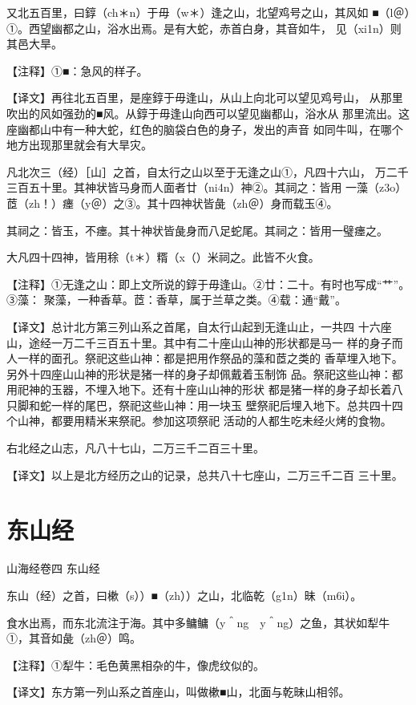 \documentclass[a4paper,12pt,UTF8,twoside]{ctexbook}
\begin{document}
又北五百里，曰錞（ch＊n）于毋（w＊）逢之山，北望鸡号之山，其风如 ■（l＠）①。西望幽都之山，浴水出焉。是有大蛇，赤首白身，其音如牛， 见（xi1n）则其邑大旱。

【注释】①■：急风的样子。

【译文】再往北五百里，是座錞于毋逢山，从山上向北可以望见鸡号山， 从那里吹出的风如强劲的■风。从錞于毋逢山向西可以望见幽都山，浴水从 那里流出。这座幽都山中有一种大蛇，红色的脑袋白色的身子，发出的声音 如同牛叫，在哪个地方出现那里就会有大旱灾。

凡北次三（经）［山］之首，自太行之山以至于无逢之山①，凡四十六山， 万二千三百五十里。其神状皆马身而人面者廿（ni4n）神②。其祠之：皆用 一藻（z3o）茝（zh！）瘗（y＠）之③。其十四神状皆彘（zh＠）身而载玉④。

其祠之：皆玉，不瘗。其十神状皆彘身而八足蛇尾。其祠之：皆用一璧瘗之。

大凡四十四神，皆用稌（t＊）糈（x（）米祠之。此皆不火食。

【注释】①无逢之山：即上文所说的錞于毋逢山。②廿：二十。有时也写成“艹”。③藻： 聚藻，一种香草。茝：香草，属于兰草之类。④载：通“戴”。

【译文】总计北方第三列山系之首尾，自太行山起到无逢山止，一共四 十六座山，途经一万二千三百五十里。其中有二十座山山神的形状都是马一 样的身子而人一样的面孔。祭祀这些山神：都是把用作祭品的藻和茝之类的 香草埋入地下。另外十四座山山神的形状是猪一样的身子却佩戴着玉制饰 品。祭祀这些山神：都用祀神的玉器，不埋入地下。还有十座山山神的形状 都是猪一样的身子却长着八只脚和蛇一样的尾巴，祭祀这些山神：用一块玉 壁祭祀后埋入地下。总共四十四个山神，都要用精米来祭祀。参加这项祭祀 活动的人都生吃未经火烤的食物。

右北经之山志，凡八十七山，二万三千二百三十里。

【译文】以上是北方经历之山的记录，总共八十七座山，二万三千二百 三十里。


\chapter{东山经}

山海经卷四 东山经


东山（经）之首，曰樕（s））■（zh））之山，北临乾（g1n）昧（m6i）。

食水出焉，而东北流注于海。其中多鳙鳙（y＾ng　y＾ng）之鱼，其状如犁牛 ①，其音如彘（zh＠）鸣。

【注释】①犁牛：毛色黄黑相杂的牛，像虎纹似的。

【译文】东方第一列山系之首座山，叫做樕■山，北面与乾昧山相邻。
\end{document}
